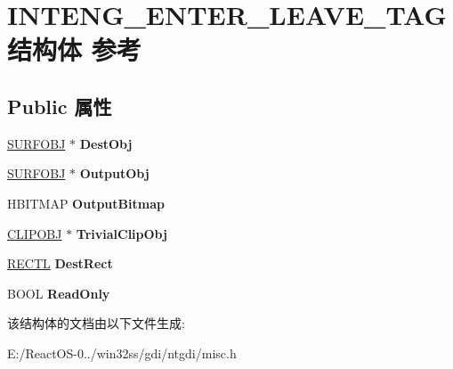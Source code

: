 \hypertarget{struct_i_n_t_e_n_g___e_n_t_e_r___l_e_a_v_e___t_a_g}{}\section{I\+N\+T\+E\+N\+G\+\_\+\+E\+N\+T\+E\+R\+\_\+\+L\+E\+A\+V\+E\+\_\+\+T\+A\+G结构体 参考}
\label{struct_i_n_t_e_n_g___e_n_t_e_r___l_e_a_v_e___t_a_g}
\subsection*{Public 属性}
\begin{DoxyCompactItemize}
\item 
\mbox{\label{struct_i_n_t_e_n_g___e_n_t_e_r___l_e_a_v_e___t_a_g_aad7176b1f715aa06815b30d151b7e6a0}} 
\hyperlink{struct___s_u_r_f_o_b_j}{S\+U\+R\+F\+O\+BJ} $\ast$ {\bfseries Dest\+Obj}
\item 
\mbox{\label{struct_i_n_t_e_n_g___e_n_t_e_r___l_e_a_v_e___t_a_g_a9462a49b3fd4c6745ef909382aa4e236}} 
\hyperlink{struct___s_u_r_f_o_b_j}{S\+U\+R\+F\+O\+BJ} $\ast$ {\bfseries Output\+Obj}
\item 
\mbox{\label{struct_i_n_t_e_n_g___e_n_t_e_r___l_e_a_v_e___t_a_g_a8ab74c2f4e221d5f263ea0a27b6cc554}} 
H\+B\+I\+T\+M\+AP {\bfseries Output\+Bitmap}
\item 
\mbox{\label{struct_i_n_t_e_n_g___e_n_t_e_r___l_e_a_v_e___t_a_g_ab59a878f39802db29e8eece32f52db08}} 
\hyperlink{struct___c_l_i_p_o_b_j}{C\+L\+I\+P\+O\+BJ} $\ast$ {\bfseries Trivial\+Clip\+Obj}
\item 
\mbox{\label{struct_i_n_t_e_n_g___e_n_t_e_r___l_e_a_v_e___t_a_g_ae7a209acbeaa399c427ef27dfde4616e}} 
\hyperlink{struct___r_e_c_t_l}{R\+E\+C\+TL} {\bfseries Dest\+Rect}
\item 
\mbox{\label{struct_i_n_t_e_n_g___e_n_t_e_r___l_e_a_v_e___t_a_g_abe183d11340c55d7d8cd4a4cd46f5118}} 
B\+O\+OL {\bfseries Read\+Only}
\end{DoxyCompactItemize}


该结构体的文档由以下文件生成\+:\begin{DoxyCompactItemize}
\item 
E\+:/\+React\+O\+S-\/0../win32ss/gdi/ntgdi/misc.\+h\end{DoxyCompactItemize}
